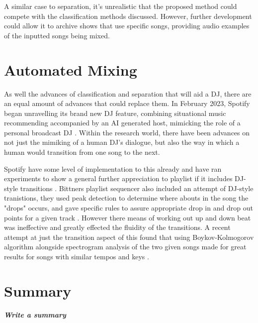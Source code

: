 A similar case to separation, it's unrealistic that the proposed method could compete with the classification methods discussed. However, further development could allow it to archive shows that use specific songs, providing audio examples of the inputted songs being mixed.

\section{Automated Mixing}
As well the advances of classification and separation that will aid a DJ, there are an equal amount of advances that could replace them. In February 2023, Spotify began unravelling its brand new DJ feature, combining situational music recommending accompanied by an AI generated host, mimicking the role of a personal broadcast DJ \citep{naomi_spotify_2023}. Within the research world, there have been advances on not just the mimiking of a human DJ's dialogue, but also the way in which a human would transition from one song to the next.

Spotify have some level of implementation to this already and have ran experiments to show a general further appreciation to playlist if it includes DJ-style transitions \citep{bittner_automatic_2017}. Bittners playlist sequencer also included an attempt of DJ-style tranistions, they used peak detection to determine where abouts in the song the "drops" occurs, and gave specific rules to assure appropriate drop in and drop out points for a given track \citep{bittner_automatic_2017}.  However there means of working out up and down beat was ineffective and greatly effected the fluidity of the transitions. A recent attempt at just the transition aspect of this found that using Boykov-Kolmogorov algorithm alongside spectrogram analysis of the two given songs made for great results for songs with similar tempos and keys \citep{robinson_automated_2023}.

\section{Summary}
\textbf{\textit{Write a summary}}

